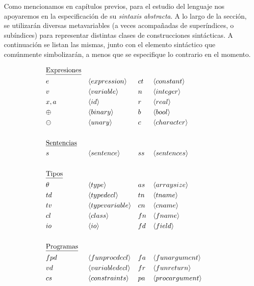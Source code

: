 Como mencionamos en capítulos previos, para el estudio del lenguaje nos apoyaremos en la especificación de su \textit{sintaxis abstracta}.
A lo largo de la sección, se utilizarán diversas metavariables (a veces acompañadas de superíndices, o subíndices) para representar distintas clases de construcciones sintácticas.
A continuación se listan las mismas, junto con el elemento sintáctico que comúnmente simbolizarán, a menos que se especifique lo contrario en el momento.

\begin{align*}
&\text{\underline{Expresiones}}
\\
&e       & &\langle expression \rangle     &  &ct      & &\langle constant \rangle       \\
&v       & &\langle variable \rangle       &  &n       & &\langle integer \rangle        \\
&x, a    & &\langle id \rangle             &  &r       & &\langle real \rangle           \\
&\oplus  & &\langle binary \rangle         &  &b       & &\langle bool \rangle           \\
&\ominus & &\langle unary \rangle          &  &c       & &\langle character \rangle      \\
\\
&\text{\underline{Sentencias}}
\\
&s       & &\langle sentence \rangle       &  &ss      & &\langle sentences \rangle      \\
\\
&\text{\underline{Tipos}}
\\
&\theta & &\langle type \rangle            &  &as      & &\langle arraysize \rangle      \\
&td     & &\langle typedecl \rangle        &  &tn      & &\langle tname \rangle          \\
&tv     & &\langle typevariable \rangle    &  &cn      & &\langle cname \rangle          \\
&cl     & &\langle class \rangle           &  &fn      & &\langle fname \rangle          \\
&io     & &\langle io \rangle              &  &fd      & &\langle field \rangle          \\
\\
&\text{\underline{Programas}}
\\
&fpd     & &\langle funprocdecl \rangle    &  &fa      & &\langle funargument \rangle    \\
&vd      & &\langle variabledecl \rangle   &  &fr      & &\langle funreturn \rangle      \\
&cs      & &\langle constraints \rangle    &  &pa      & &\langle procargument \rangle   \\
\end{align*}


